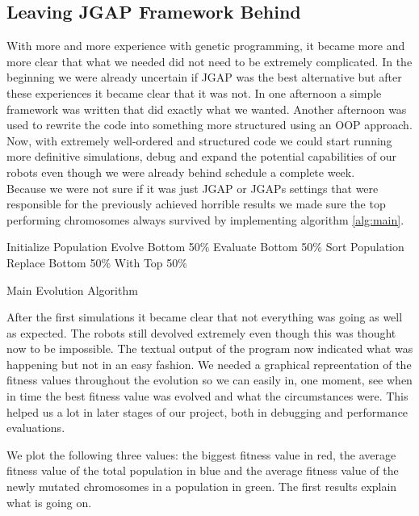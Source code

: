 \documentclass[a4paper,10pt]{article}
\begin{document}
\subsection{Leaving JGAP Framework Behind}
With more and more experience with genetic programming, it became more and more clear that what we needed did not need to be extremely complicated. In the beginning 
we were already uncertain if JGAP was the best alternative but after these experiences it became clear that it was not. In one afternoon a simple framework was written
that did exactly what we wanted. Another afternoon was used to rewrite the code into something more structured using an OOP approach. Now, with extremely well-ordered and
structured code we could start running more definitive simulations, debug and expand the potential capabilities of our robots even though we were already behind schedule
a complete week. \\

Because we were not sure if it was just JGAP or JGAPs settings that were responsible for the previously achieved
 horrible results we made sure the top performing 
chromosomes always survived by implementing algorithm \ref{alg:main}.


\begin{algorithm}
\begin{algorithmic}
\STATE Initialize Population
    \STATE Evolve Bottom 50\%
    \STATE Evaluate Bottom 50\%
    \STATE Sort Population 
    \STATE Replace Bottom 50\% With Top 50\%
\ENDWHILE
\end{algorithmic}
\caption{Main Evolution Algorithm}
\label{alg:main}
\end{algorithm}

After the first simulations it became clear that not everything was going as well as expected. The robots still devolved extremely even though this was thought now to be 
impossible. The textual output of the program now indicated what was happening but not in an easy fashion. We needed a graphical repreentation of the fitness values 
throughout the evolution so we can easily in, one moment, see when in time the best fitness value was evolved and what the circumstances were. This helped us a lot in later
stages of our project, both in debugging and performance evaluations.

We plot the following three values: the biggest fitness value in red, the average fitness value of the total population in blue and the average fitness value of the 
newly mutated chromosomes in a population in green. The first results explain what is going on.
\end{document}
